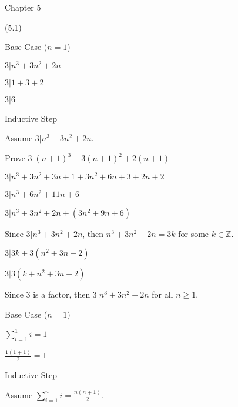 \documentclass{exam}
\begin{document}
\begin{questions}



\vspace{10pt}
{\Large Chapter 5}
\vspace{2pt}

 (5.1)

\begin{center}

Base Case (\(n = 1\))

\(3|n^3 + 3n^2 + 2n\)

\(3|1 + 3 + 2\)

\(3|6\)
\vspace{5px}

Inductive Step

Assume \(3 | n^3 + 3n^2 + 2n\). 

Prove \(3 | (n+1)^3 + 3(n+1)^2 + 2(n+1)\)

\(3 | n^3 + 3n^2 + 3n + 1 + 3n^2 + 6n + 3 + 2n + 2\)

\(3 | n^3 + 6n^2 + 11n + 6\)

\(3 | n^3 + 3n^2 + 2n + (3n^2 + 9n + 6)\)

Since \(3 | n^3 + 3n^2 + 2n\), then \(n^3 + 3n^2 + 2n = 3k\) for some \(k \in \mathbb{Z}\).

\(3 | 3k + 3(n^2 + 3n + 2)\)

\(3 | 3(k+n^2+3n+2)\)

Since 3 is a factor, then \(3 | n^3 + 3n^2 + 2n\) for all \( n \geq 1 \).

\end{center}

\begin{subparts}

\begin{center}

Base Case (\(n = 1\))

\(\sum_{i=1}^{1} i = 1\)

\(\frac{1(1+1)}{2} = 1\)
\vspace{5px}

Inductive Step

Assume \( \sum_{i=1}^{n} i = \frac{n(n+1)}{2} \). 


\end{center}
\end{subparts}
\end{questions}
\end{document}
